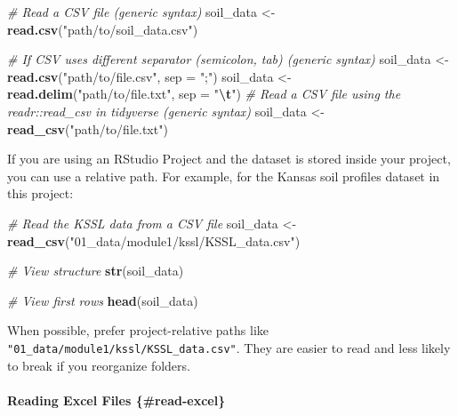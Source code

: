 \documentclass[
  10pt,
  b5paper,
  oneside]{book}
\newenvironment{Shaded}{\begin{snugshade}}{\end{snugshade}}
\newcommand{\AttributeTok}[1]{\textcolor[rgb]{0.13,0.29,0.53}{#1}}
\newcommand{\CommentTok}[1]{\textcolor[rgb]{0.56,0.35,0.01}{\textit{#1}}}
\newcommand{\FunctionTok}[1]{\textcolor[rgb]{0.13,0.29,0.53}{\textbf{#1}}}
\newcommand{\NormalTok}[1]{#1}
\newcommand{\OtherTok}[1]{\textcolor[rgb]{0.56,0.35,0.01}{#1}}
\newcommand{\SpecialCharTok}[1]{\textcolor[rgb]{0.81,0.36,0.00}{\textbf{#1}}}
\newcommand{\StringTok}[1]{\textcolor[rgb]{0.31,0.60,0.02}{#1}}
\begin{document}
\begin{Shaded}
\begin{Highlighting}[]
\CommentTok{\# Read a CSV file (generic syntax)}
\NormalTok{soil\_data }\OtherTok{\textless{}{-}} \FunctionTok{read.csv}\NormalTok{(}\StringTok{"path/to/soil\_data.csv"}\NormalTok{)}

\CommentTok{\# If CSV uses different separator (semicolon, tab) (generic syntax)}
\NormalTok{soil\_data }\OtherTok{\textless{}{-}} \FunctionTok{read.csv}\NormalTok{(}\StringTok{"path/to/file.csv"}\NormalTok{, }\AttributeTok{sep =} \StringTok{";"}\NormalTok{)}
\NormalTok{soil\_data }\OtherTok{\textless{}{-}} \FunctionTok{read.delim}\NormalTok{(}\StringTok{"path/to/file.txt"}\NormalTok{, }\AttributeTok{sep =} \StringTok{"}\SpecialCharTok{\textbackslash{}t}\StringTok{"}\NormalTok{)}
\CommentTok{\# Read a CSV file using the \textasciigrave{}readr::read\_csv\textasciigrave{} in tidyverse  (generic syntax)}
\NormalTok{soil\_data }\OtherTok{\textless{}{-}} \FunctionTok{read\_csv}\NormalTok{(}\StringTok{"path/to/file.txt"}\NormalTok{)}
\end{Highlighting}
\end{Shaded}

If you are using an RStudio Project and the dataset is stored inside your project, you can use a relative path. For example, for the Kansas soil profiles dataset in this project:

\begin{Shaded}
\begin{Highlighting}[]
\CommentTok{\# Read the KSSL data from a CSV file}
\NormalTok{soil\_data }\OtherTok{\textless{}{-}} \FunctionTok{read\_csv}\NormalTok{(}\StringTok{"01\_data/module1/kssl/KSSL\_data.csv"}\NormalTok{)}

\CommentTok{\# View structure}
\FunctionTok{str}\NormalTok{(soil\_data)}

\CommentTok{\# View first rows}
\FunctionTok{head}\NormalTok{(soil\_data)}
\end{Highlighting}
\end{Shaded}

When possible, prefer project-relative paths like \texttt{"01\_data/module1/kssl/KSSL\_data.csv"}.
They are easier to read and less likely to break if you reorganize folders.

\paragraph*{Reading Excel Files \{\#read-excel\}}\label{reading-excel-files-read-excel}
\end{document}
